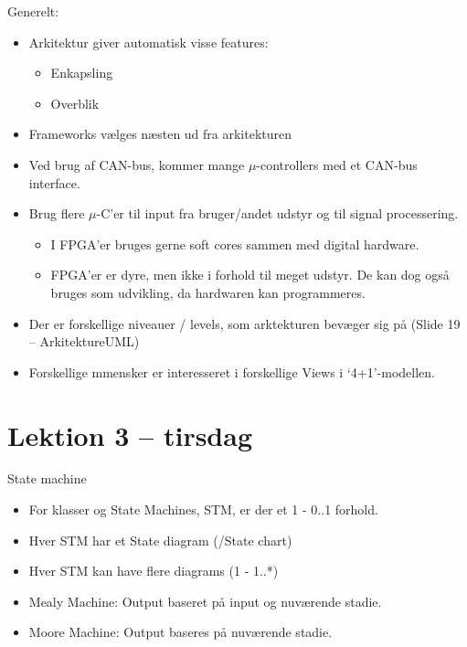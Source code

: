 \documentclass{article}
\begin{document}
Generelt:
\begin{itemize}
	\item Arkitektur giver automatisk visse features:
	\begin{itemize}
		\item Enkapsling
		\item Overblik
	\end{itemize}
	\item Frameworks vælges næsten ud fra arkitekturen
	\item Ved brug af CAN-bus, kommer mange $\mu$-controllers med et CAN-bus interface.
	\item Brug flere $\mu$-C'er til input fra bruger/andet udstyr og til signal processering.
	\begin{itemize}
		\item I FPGA'er bruges gerne soft cores sammen med digital hardware. 
		\item FPGA'er er dyre, men ikke i forhold til meget udstyr. De kan dog også bruges som udvikling, da hardwaren kan programmeres.
	\end{itemize}

	\item Der er forskellige niveauer / levels, som arktekturen bevæger sig på (Slide 19 -- ArkitektureUML)


	\item Forskellige mmensker er interesseret i forskellige Views i `4+1'-modellen.
\end{itemize}


\section{Lektion 3 -- tirsdag}

State machine
\begin{itemize}
	\item For klasser og State Machines, STM, er der et 1 - 0..1 forhold.
	\item Hver STM har et State diagram (/State chart)
	\item Hver STM kan have flere diagrams (1 - 1..*)
	\item Mealy Machine: Output baseret på input og nuværende stadie.
	\item Moore Machine: Output baseres på nuværende stadie.
\end{itemize}
\end{document}
